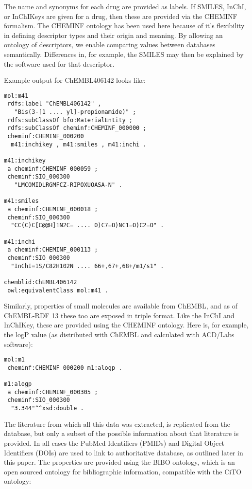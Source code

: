 \documentclass[10pt]{bmc_article}
\newenvironment{bmcformat}{\begin{raggedright}\baselineskip20pt\sloppy\setboolean{publ}{false}}{\end{raggedright}\baselineskip20pt\sloppy}
\begin{document}
\begin{bmcformat}
The name and synonyms for each drug are
provided as labels. If SMILES, InChI, or InChIKeys are given for a drug, then these are
provided via the CHEMINF formalism.
The CHEMINF ontology has been used here because of it's flexibility in defining
descriptor types and their origin and meaning. By allowing an ontology of descriptors,
we enable comparing values between databases semantically. Differences in, for example,
the SMILES may then be explained by the software used for that descriptor.

Example output for ChEMBL406142 looks like:

\begin{small}
\begin{verbatim}
mol:m41
 rdfs:label "ChEMBL406142" , 
   "Bis(3-[1 .... yl]-propionamide)" ;
 rdfs:subClassOf bfo:MaterialEntity ;
 rdfs:subClassOf cheminf:CHEMINF_000000 ;
 cheminf:CHEMINF_000200
  m41:inchikey , m41:smiles , m41:inchi .

m41:inchikey
 a cheminf:CHEMINF_000059 ;
 cheminf:SIO_000300
   "LMCOMIDLRGMFCZ-RIPOXUOASA-N" .

m41:smiles
 a cheminf:CHEMINF_000018 ;
 cheminf:SIO_000300
  "CC(C)C[C@@H]1N2C= .... O)C7=O)NC1=O)C2=O" .

m41:inchi
 a cheminf:CHEMINF_000113 ;
 cheminf:SIO_000300
  "InChI=1S/C82H102N .... 66+,67+,68+/m1/s1" .

chemblid:ChEMBL406142
 owl:equivalentClass mol:m41 .
\end{verbatim}
\end{small}

Similarly, properties of small molecules are available from ChEMBL, and as of ChEMBL-RDF 13
these too are exposed in triple format. Like the InChI and InChIKey, these are provided using the
CHEMINF ontology. Here is, for example, the logP value (as distributed with ChEMBL and
calculated with ACD/Labs software):

\begin{small}
\begin{verbatim}
mol:m1
 cheminf:CHEMINF_000200 m1:alogp .

m1:alogp
 a cheminf:CHEMINF_000305 ;
 cheminf:SIO_000300
  "3.344"^^xsd:double .
\end{verbatim}
\end{small}

The literature from which all this data was extracted, is replicated from the database,
but only a subset of the possible information about that literature is provided. In all cases 
the PubMed Identifiers (PMIDs) and Digital Object Identifiers (DOIs) are used to link
to authoritative database, as outlined later in this paper.
The properties are provided using the BIBO ontology, which is an open sourced ontology
for bibliographic information, compatible with the CiTO ontology:


\end{bmcformat}
\end{document}
